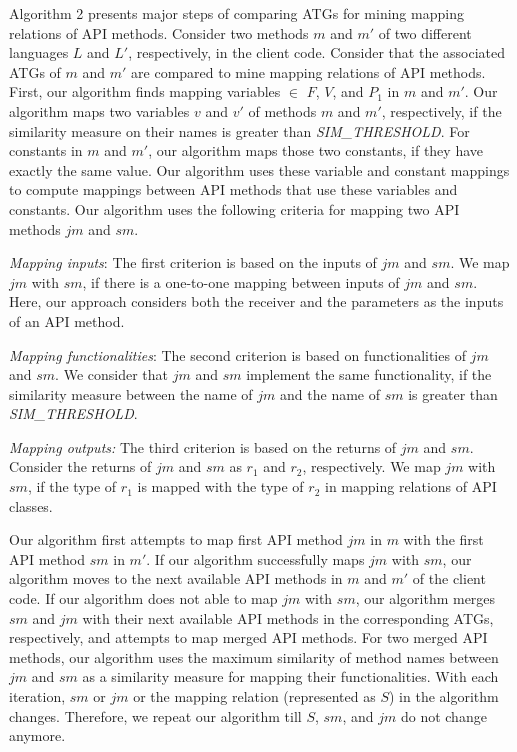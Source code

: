 Algorithm 2 presents major steps of comparing ATGs for mining
mapping relations of API methods. Consider two methods $m$ and $m'$
of two different languages $L$ and $L'$, respectively, in the client
code. Consider that the associated ATGs of $m$ and $m'$ are compared
to mine mapping relations of API methods. First, our algorithm finds
mapping variables $\in$ $F$, $V$, and $P_1$ in $m$ and $m'$. Our
algorithm maps two variables $v$ and $v'$ of methods $m$ and $m'$,
respectively, if the similarity measure on their names is greater
than \emph{SIM\_THRESHOLD}. For constants in $m$ and $m'$, our
algorithm maps those two constants, if they have exactly the same
value. Our algorithm uses these variable and constant mappings to
compute mappings between API methods that use these variables and
constants. Our algorithm uses the following criteria for mapping two
API methods $jm$ and $sm$.

\emph{Mapping inputs}: The first criterion is based on the inputs
of $jm$ and $sm$. We map $jm$ with $sm$, if there is a one-to-one
mapping between inputs of $jm$ and $sm$. Here, our approach
considers both the receiver and the parameters as the inputs of an
API method.

\emph{Mapping functionalities}: The second criterion is based on functionalities of
$jm$ and $sm$. We consider that $jm$ and $sm$ implement the same functionality,
if the similarity measure between the name of $jm$ and the name of $sm$ is
greater than \emph{SIM\_THRESHOLD}.

\emph{Mapping outputs:} The third criterion is based on the returns of $jm$ and $sm$.
Consider the returns of $jm$ and $sm$ as $r_1$ and $r_2$, respectively. We map $jm$
with $sm$, if the type of $r_1$ is mapped with the type of $r_2$ in
mapping relations of API classes.

Our algorithm first attempts to map first API method $jm$ in $m$
with the first API method $sm$ in $m'$. If our algorithm successfully maps $jm$ with
$sm$, our algorithm moves to the next available API methods in $m$
and $m'$ of the client code. If our algorithm does not able to map $jm$
with $sm$, our algorithm merges $sm$ and $jm$ with their next available API methods
in the corresponding ATGs, respectively, and attempts to map merged API methods.
For two merged API methods, our algorithm uses the
maximum similarity of method names between $jm$ and $sm$ as a
similarity measure for mapping their functionalities.
With each iteration, $sm$ or $jm$ or the mapping relation (represented as $S$)
in the algorithm changes. Therefore, we repeat our algorithm
till $S$, $sm$, and $jm$ do not change anymore.


